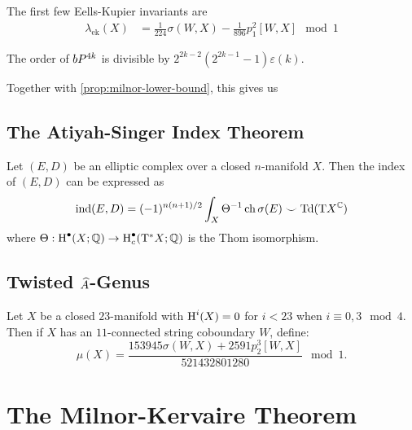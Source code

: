 \begin{example}
	The first few Eells-Kupier invariants are
	\[
		\begin{aligned}
			\lambda_{\mathrm{ek}}(X) &= \frac{1}{224}\sigma(W,X)-\frac{1}{896}p_1^2[W, X]\mod 1
		\end{aligned}
	\]
\end{example}

\begin{proposition}
	The order of $bP^{4k}$ is divisible by $2^{2k-2}(2^{2k-1}-1)\varepsilon(k)$.
\end{proposition}

Together with \cref{prop:milnor-lower-bound}, this gives us


\subsection{The Atiyah-Singer Index Theorem}


\begin{theorem}\label{thm:atiyah-singer}
	Let $(E,D)$ be an elliptic complex over a closed $n$-manifold $X$. Then the index of $(E,D)$ can be expressed as
	\[
		\operatorname{\operatorname{ind}}(E,D) = (-1)^{n(n+1)/2}\int_X \Theta^{-1}\operatorname{\operatorname{ch}} \sigma(E)\smile \operatorname{\operatorname{Td}}(\mathrm{T} X^{\mathbb{C}})
	\]
	where $\Theta : \operatorname{H}^\bullet(X;\mathbb{Q}) \to \operatorname{H}_c^\bullet(\mathrm{T}^* X;\mathbb{Q})$ is the Thom isomorphism.
\end{theorem}

\subsection{Twisted $\widehat{A}$-Genus}

\begin{definition*}
	Let $X$ be a closed $23$-manifold with $\operatorname{H}^i(X)=0$ for $i<23$ when $i\equiv 0,3\mod 4$. Then if $X$ has an $11$-connected string coboundary $W$, define: 
	\[
		\mu(X) = \frac{153945\sigma(W,X) + 2591p_2^3[W, X]}{521432801280}\mod 1.
	\]
\end{definition*}

\section{The Milnor-Kervaire Theorem}\label{sec:milnor-kervaire-theorem}

